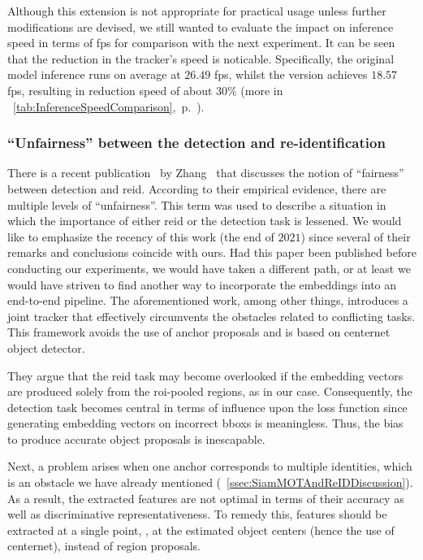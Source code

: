 Although this extension is not appropriate for practical usage unless further modifications are devised, we still wanted to evaluate the impact on inference speed in terms of \gls{fps} for comparison with the next experiment. It can be seen that the reduction in the tracker's speed is noticable. Specifically, the original model inference runs on average at $26.49$ \gls{fps}, whilst the \fembmodel{} version achieves $18.57$ \gls{fps}, resulting in reduction speed of about $30$\% (more in \tabletext{}~\ref{tab:InferenceSpeedComparison},~p.~\pageref{tab:InferenceSpeedComparison}).

\subsubsection{``Unfairness'' between the detection and re-identification}

There is a recent publication~\cite{zhang2021fairmot} by Zhang~\etal{} that discusses the notion of ``fairness'' between detection and \gls{reid}. According to their empirical evidence, there are multiple levels of ``unfairness''. This term was used to describe a situation in which the importance of either \gls{reid} or the detection task is lessened. We would like to emphasize the recency of this work (the end of $2021$) since several of their remarks and conclusions coincide with ours. Had this paper been published before conducting our experiments, we would have taken a different path, or at least we would have striven to find another way to incorporate the embeddings into an end-to-end pipeline. The aforementioned work, among other things, introduces a joint tracker that effectively circumvents the obstacles related to conflicting tasks. This framework avoids the use of anchor proposals and is based on \gls{centernet}~\cite{zhou2019centernet} object detector.

They argue that the \gls{reid} task may become overlooked if the embedding vectors are produced solely from the \gls{roi}-pooled regions, as in our case. Consequently, the detection task becomes central in terms of influence upon the loss function since generating embedding vectors on incorrect \glspl{bbox} is meaningless. Thus, the bias to produce accurate object proposals is inescapable.

Next, a problem arises when one anchor corresponds to multiple identities, which is an obstacle we have already mentioned (\sectiontext{}~\ref{ssec:SiamMOTAndReIDDiscussion}). As a result, the extracted features are not optimal in terms of their accuracy as well as discriminative representativeness. To remedy this, features should be extracted at a single point, \ietext{}, at the estimated object centers (hence the use of \gls{centernet}), instead of region proposals.

